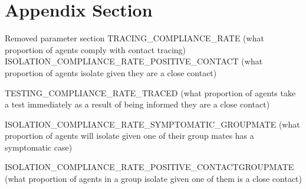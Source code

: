 \documentclass{article}
\begin{document}
\newpage
\appendix

\section{Appendix Section}

Removed parameter section
TRACING\_COMPLIANCE\_RATE (what proportion of agents comply with contact tracing)
ISOLATION\_COMPLIANCE\_RATE\_POSITIVE\_CONTACT (what proportion of agents isolate given they are a close contact)

TESTING\_COMPLIANCE\_RATE\_TRACED (what proportion of agents take a test immediately as a result of being informed they are a close contact)


\item ISOLATION\_COMPLIANCE\_RATE\_SYMPTOMATIC\_GROUPMATE (what proportion of agents will isolate given one of their group mates has a symptomatic case)

\item ISOLATION\_COMPLIANCE\_RATE\_POSITIVE\_CONTACTGROUPMATE (what proportion of agents in a group isolate given one of them is a close contact)
\end{document}
